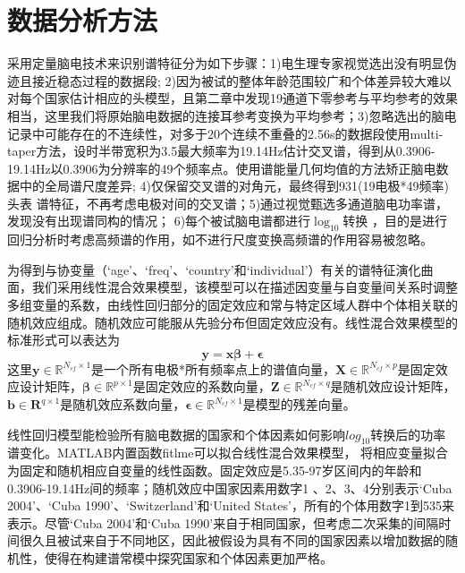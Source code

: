 \section{数据分析方法}\label{ch:lme}
采用定量脑电技术来识别谱特征分为如下步骤：1)电生理专家视觉选出没有明显伪迹且接近稳态过程的数据段; 2)因为被试的整体年龄范围较广和个体差异较大难以对每个国家估计相应的头模型，且第二章中发现19通道下零参考与平均参考的效果相当，这里我们将原始脑电数据的连接耳参考变换为平均参考；3)忽略选出的脑电记录中可能存在的不连续性，对多于20个连续不重叠的2.56s的数据段使用multi-taper方法，设时半带宽积为3.5最大频率为19.14Hz估计交叉谱，得到从0.3906-19.14Hz以0.3906为分辨率的49个频率点。使用谱能量几何均值的方法矫正脑电数据中的全局谱尺度差异; 4)仅保留交叉谱的对角元，最终得到931(19电极*49频率)头表
谱特征，不再考虑电极对间的交叉谱；5)通过视觉甄选多通道脑电功率谱，发现没有出现谱同构的情况； 6)每个被试脑电谱都进行$\log_{10}$转换
，目的是进行回归分析时考虑高频谱的作用，如不进行尺度变换高频谱的作用容易被忽略。

为得到与协变量（‘age’、‘freq’、‘country’和‘individual’）有关的谱特征演化曲面，我们采用线性混合效果模型，该模型可以在描述因变量与自变量间关系时调整多组变量的系数，由线性回归部分的固定效应和常与特定区域人群中个体相关联的随机效应组成。随机效应可能服从先验分布但固定效应没有。线性混合效果模型的标准形式可以表达为
\begin{equation*}
\mathbf{y=x\beta+\epsilon}
\end{equation*}
这里$\mathbf{y}\in{\mathbb{R}^{N_{cf}\times{1}}}$是一个所有电极*所有频率点上的谱值向量，$\mathbf{X}\in{\mathbb{R}^{N_{cf}\times{p}}}$是固定效应设计矩阵，$\mathbf{\beta}\in{\mathbb{R}^{p\times{1}}}$是固定效应的系数向量，$\mathbf{Z}\in{\mathbb{R}^{N_{cf}\times{q}}}$是随机效应设计矩阵，$\mathbf{b}\in{\mathbf{R}^{q\times{1}}}$是随机效应系数向量，$\mathbf{\epsilon}\in{\mathbb{R}^{N_{cf}\times{1}}}$是模型的残差向量。

线性回归模型能检验所有脑电数据的国家和个体因素如何影响$log_{10}$转换后的功率谱变化。MATLAB内置函数fitlme可以拟合线性混合效果模型，
将相应变量拟合为固定和随机相应自变量的线性函数。固定效应是5.35-97岁区间内的年龄和0.3906-19.14Hz间的频率；随机效应中国家因素用数字1
、2、3、4分别表示‘Cuba 2004’、‘Cuba 1990’、‘Switzerland’和‘United States’，所有的个体用数字1到535来表示。尽管‘Cuba 2004’和‘Cuba 1990’来自于相同国家，但考虑二次采集的间隔时间很久且被试来自于不同地区，因此被假设为具有不同的国家因素以增加数据的随机性，使得在构建谱常模中探究国家和个体因素更加严格。

